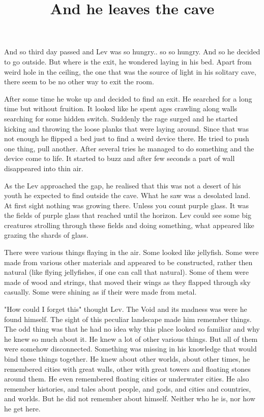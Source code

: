 \documentclass[14p]{article}
\begin{document}
\title{And he leaves the cave}
\maketitle

And so third day passed and Lev was so hungry.. so so hungry. And so he decided to go outside. But where is the exit, he wondered laying in his bed. Apart from weird hole in the ceiling, the one that was the source of light in his solitary cave, there seem to be no other way to exit the room.

After some time he woke up and decided to find an exit. He searched for a long time but without fruition. It looked like he spent ages crawling along walls searching for some hidden switch. Suddenly the rage surged and he started kicking and throwing the loose planks that were laying around. Since that was not enough he flipped a bed just to find a weird device there. He tried to push one thing, pull another. After several tries he managed to do something and the device come to life. It started to buzz and after few seconds a part of wall disappeared into thin air.

As the Lev approached the gap, he realised that this was not a desert of his youth he expected to find outside the cave. What he saw was a desolated land. At first sight nothing was growing there. Unless you count purple glass. It was the fields of purple glass that reached until the horizon. Lev could see some big creatures strolling through these fields and doing something, what appeared like grazing the shards of glass. 

There were various things flaying in the air. Some looked like jellyfish. Some were made from various other materials and appeared to be constructed, rather then natural (like flying jellyfishes, if one can call that natural). Some of them were made of wood and strings, that moved their wings as they flapped through sky casually. Some were shining as if their were made from metal.

"How could I forget this" thought Lev. The Void and its madness was were he found himself. The sight of this peculiar landscape made him remember things. The odd thing was that he had no idea why this place looked so familiar and why he knew so much about it. He knew a lot of other various things. But all of them were somehow disconnected. Something was missing in his knowledge that would bind these things together. He knew about other worlds, about other times, he remembered cities with great walls, other with great towers and floating stones around them. He even remembered floating cities or underwater cities. He also remember histories, and tales about people, and gods, and cities and countries, and worlds. But he did not remember about himself. Neither who he is, nor how he get here.
\end{document}
